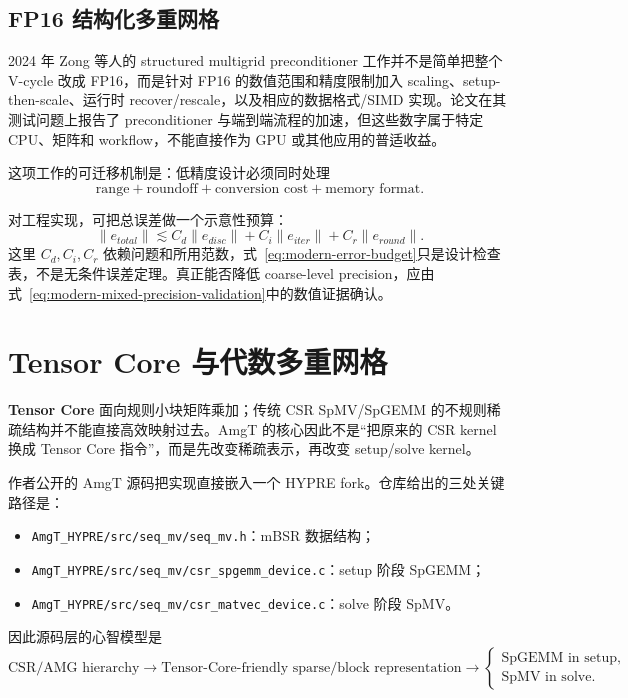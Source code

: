 \subsection{FP16 结构化多重网格}

2024 年 Zong 等人的 structured multigrid preconditioner 工作并不是简单把整个 V-cycle 改成 FP16，而是针对 FP16 的数值范围和精度限制加入 scaling、setup-then-scale、运行时 recover/rescale，以及相应的数据格式/SIMD 实现\cite{zong2024fp16}。论文在其测试问题上报告了 preconditioner 与端到端流程的加速，但这些数字属于特定 CPU、矩阵和 workflow，不能直接作为 GPU 或其他应用的普适收益。

这项工作的可迁移机制是：低精度设计必须同时处理
\begin{equation}
\boxed{
\text{range}
+
\text{roundoff}
+
\text{conversion cost}
+
\text{memory format}.
}
\end{equation}

对工程实现，可把总误差做一个示意性预算：
\begin{equation}
\|e_{total}\|
\lesssim
C_d\|e_{disc}\|+
C_i\|e_{iter}\|+
C_r\|e_{round}\|.
\label{eq:modern-error-budget}
\end{equation}
这里 $C_d,C_i,C_r$ 依赖问题和所用范数，式~\eqref{eq:modern-error-budget}只是设计检查表，不是无条件误差定理。真正能否降低 coarse-level precision，应由式~\eqref{eq:modern-mixed-precision-validation}中的数值证据确认。

\section{Tensor Core 与代数多重网格}

\textbf{Tensor Core} 面向规则小块矩阵乘加；传统 CSR SpMV/SpGEMM 的不规则稀疏结构并不能直接高效映射过去。AmgT 的核心因此不是“把原来的 CSR kernel 换成 Tensor Core 指令”，而是先改变稀疏表示，再改变 setup/solve kernel\cite{lu2024amgt}。

作者公开的 AmgT 源码把实现直接嵌入一个 HYPRE fork\cite{amgtRepo2026}。仓库给出的三处关键路径是：
\begin{itemize}
\item \texttt{AmgT\_HYPRE/src/seq\_mv/seq\_mv.h}：mBSR 数据结构；
\item \texttt{AmgT\_HYPRE/src/seq\_mv/csr\_spgemm\_device.c}：setup 阶段 SpGEMM；
\item \texttt{AmgT\_HYPRE/src/seq\_mv/csr\_matvec\_device.c}：solve 阶段 SpMV。
\end{itemize}

因此源码层的心智模型是
\begin{equation}
\boxed{
\text{CSR/AMG hierarchy}
\rightarrow
\text{Tensor-Core-friendly sparse/block representation}
\rightarrow
\begin{cases}
\text{SpGEMM in setup},\\
\text{SpMV in solve}.
\end{cases}
}
\label{eq:modern-amgt-path}
\end{equation}

